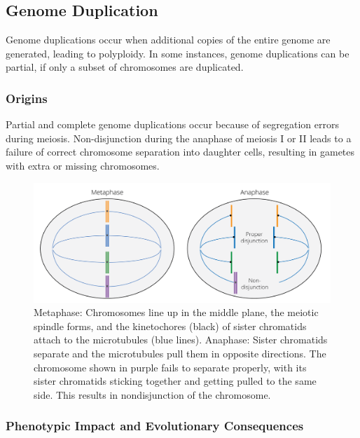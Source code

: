 \documentclass[
]{book}
\begin{document}
\hypertarget{genome-duplication}{%
\subsection{Genome Duplication}\label{genome-duplication}}

Genome duplications occur when additional copies of the entire genome are generated, leading to polyploidy. In some instances, genome duplications can be partial, if only a subset of chromosomes are duplicated.

\hypertarget{origins-3}{%
\subsubsection*{Origins}\label{origins-3}}

Partial and complete genome duplications occur because of segregation errors during meiosis. Non-disjunction during the anaphase of meiosis I or II leads to a failure of correct chromosome separation into daughter cells, resulting in gametes with extra or missing chromosomes.

\begin{figure}
\includegraphics[width=1\linewidth]{images/nondisjunction} \caption{Metaphase: Chromosomes line up in the middle plane, the meiotic spindle forms, and the kinetochores (black) of sister chromatids attach to the microtubules (blue lines). Anaphase: Sister chromatids separate and the microtubules pull them in opposite directions. The chromosome shown in purple fails to separate properly, with its sister chromatids sticking together and getting pulled to the same side. This results in nondisjunction of the chromosome.}\label{fig:nondisjunction}
\end{figure}

\hypertarget{phenotypic-impact-and-evolutionary-consequences-3}{%
\subsubsection*{Phenotypic Impact and Evolutionary Consequences}\label{phenotypic-impact-and-evolutionary-consequences-3}}
\end{document}

